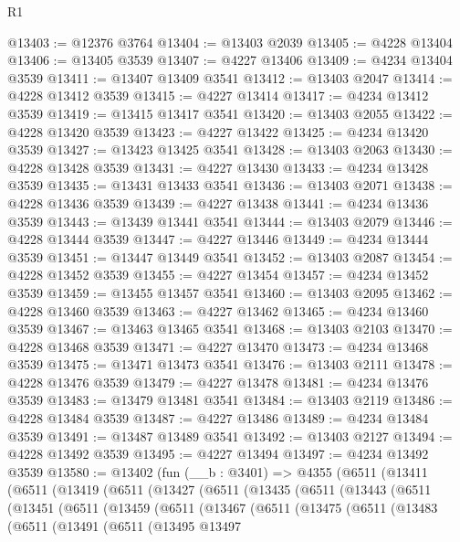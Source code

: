 \begin{lexlean}{R1}
\begin{coremodule}
@13403 := @12376 @3764
@13404 := @13403 @2039
@13405 := @4228 @13404
@13406 := @13405 @3539
@13407 := @4227 @13406
@13409 := @4234 @13404 @3539
@13411 := @13407 @13409 @3541
@13412 := @13403 @2047
@13414 := @4228 @13412 @3539
@13415 := @4227 @13414
@13417 := @4234 @13412 @3539
@13419 := @13415 @13417 @3541
@13420 := @13403 @2055
@13422 := @4228 @13420 @3539
@13423 := @4227 @13422
@13425 := @4234 @13420 @3539
@13427 := @13423 @13425 @3541
@13428 := @13403 @2063
@13430 := @4228 @13428 @3539
@13431 := @4227 @13430
@13433 := @4234 @13428 @3539
@13435 := @13431 @13433 @3541
@13436 := @13403 @2071
@13438 := @4228 @13436 @3539
@13439 := @4227 @13438
@13441 := @4234 @13436 @3539
@13443 := @13439 @13441 @3541
@13444 := @13403 @2079
@13446 := @4228 @13444 @3539
@13447 := @4227 @13446
@13449 := @4234 @13444 @3539
@13451 := @13447 @13449 @3541
@13452 := @13403 @2087
@13454 := @4228 @13452 @3539
@13455 := @4227 @13454
@13457 := @4234 @13452 @3539
@13459 := @13455 @13457 @3541
@13460 := @13403 @2095
@13462 := @4228 @13460 @3539
@13463 := @4227 @13462
@13465 := @4234 @13460 @3539
@13467 := @13463 @13465 @3541
@13468 := @13403 @2103
@13470 := @4228 @13468 @3539
@13471 := @4227 @13470
@13473 := @4234 @13468 @3539
@13475 := @13471 @13473 @3541
@13476 := @13403 @2111
@13478 := @4228 @13476 @3539
@13479 := @4227 @13478
@13481 := @4234 @13476 @3539
@13483 := @13479 @13481 @3541
@13484 := @13403 @2119
@13486 := @4228 @13484 @3539
@13487 := @4227 @13486
@13489 := @4234 @13484 @3539
@13491 := @13487 @13489 @3541
@13492 := @13403 @2127
@13494 := @4228 @13492 @3539
@13495 := @4227 @13494
@13497 := @4234 @13492 @3539
@13580 := @13402
    (fun (__b : @3401) =>
    @4355
      (@6511
        (@13411
          (@6511
            (@13419
              (@6511
                (@13427
                  (@6511
                    (@13435
                      (@6511
                        (@13443
                          (@6511
                            (@13451
                              (@6511
                                (@13459
                                  (@6511
                                    (@13467
                                      (@6511
                                        (@13475
                                          (@6511
                                            (@13483
                                              (@6511
                                                (@13491
                                                  (@6511
                                                    (@13495
                                                      @13497

\end{coremodule}
\end{lexlean}
